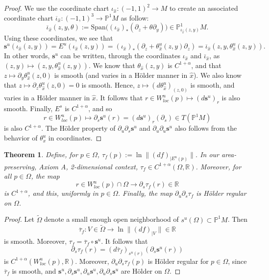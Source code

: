 \documentclass[a4paper]{article}
\newtheorem{theorem}{Theorem}[section]
\theoremstyle{definition}
\begin{document}
\begin{proof}
We use the coordinate chart $\iota_{\widehat{x}} : (-1,1)^2 \rightarrow M$ to create an associated coordinate chart
$ \overline{\iota}_{\widehat{x}} : (-1,1)^3 \rightarrow \mathbb{P}^1 M $ as follow:
$$ \overline{\iota}_{\widehat{x}}(z,y,\theta) := \text{Span} \Big( (\iota_{\widehat{x}})_* (\partial_z + \theta \partial_y) \Big) \in \mathbb{P}^1_{\iota_{\widehat{x}}(z,y)} M.$$
Using these coordinates, we see that
$$ \mathbf{s}^u( \iota_{\widehat{x}}(z,y) ) = E^u(\iota_{\widehat{x}}(z,y)) = (\iota_{\widehat{x}})_*(\partial_z + \theta_{\widehat{x}}^u(z,y) \partial_z ) = \overline{\iota}_{\widehat{x}}(z,y,\theta_{\widehat{x}}^u(z,y)).$$
In other words, $\mathbf{s}^u$ can be written, through the coordinates $\iota_{\widehat{x}}$ and $\overline{\iota}_{\widehat{x}}$, as $(z,y) \mapsto (z,y,\theta_{\widehat{x}}^u(z,y))$.
We know that $\theta_{\widehat{x}}(z,y)$ is $C^{1+\alpha}$, and that $z \mapsto \partial_y \theta_{\widehat{x}}^u(z,0) $ is smooth (and varies in a Hölder manner in ${\widehat{x}}$).
We also know that $z \mapsto \partial_z \theta_{\widehat{x}}^u(z,0) = 0$ is smooth. Hence, $z \mapsto (d\theta_{\widehat{x}}^u)_{(z,0)}$ is smooth, and varies in a Hölder manner in ${\widehat{x}}$. It follows that $r \in W^u_{loc}(p) \mapsto (d \mathbf{s}^u)_r $ is also smooth. Finally, $E^s$ is $C^{1+\alpha}$, and so 
$$r \in W^u_{loc}(p) \mapsto \partial_s \mathbf{s}^u(r) = (d \mathbf{s}^u)_r(\partial_s) \in T(\mathbb{P}^1 M) $$
is also $C^{1+\alpha}$. The Hölder property of $\partial_u \partial_s \mathbf{s}^u$ and $\partial_u \partial_u \mathbf{s}^u$ also follows from the behavior of $\theta_x^u$ in coordinates.
\end{proof}

\begin{theorem}
Define, for $p \in \Omega$, $\tau_f(p) := \ln \|{ (df)}_{|E^u(p)} \|$. In our area-preserving, Axiom A, 2-dimensional context, $\tau_f \in C^{1+\alpha}(\Omega,\mathbb{R})$. Moreover, for all $p \in \Omega$, the map $$ r \in W^u_{loc}(p) \cap \Omega \longrightarrow \partial_s \tau_f(r) \in \mathbb{R} $$
is $C^{1+\alpha}$, and this, uniformly in $p \in \Omega$. Finally, the map $\partial_u \partial_s \tau_f$ is Hölder regular on $\Omega$.
\end{theorem}

\begin{proof}
Let $\tilde{\Omega}$ denote a small enough open neighborhood of $s^u(\Omega) \subset \mathbb{P}^1 M$. Then $$ \overline{\tau}_f : V \in \tilde{\Omega} \longrightarrow \ln \| (df)_{|V} \| \in \mathbb{R} $$
is smooth. Moreover, $\tau_f = \overline{\tau}_f \circ \mathbf{s}^u$. It follows that $$ \partial_s \tau_f(r) = (d \overline{\tau}_f)_{s^u(r)}( \partial_s \mathbf{s}^u(r) ) $$ is $C^{1+\alpha}(W^u_{loc}(p),\mathbb{R})$. Moreover, $\partial_u \partial_s \tau_f(p)$ is Hölder regular for $p \in \Omega$, since $\overline{\tau}_f$ is smooth, and $\mathbf{s}^u, \partial_s \mathbf{s}^u,\partial_u \mathbf{s}^u, \partial_u \partial_s \mathbf{s}^u$ are Hölder on $\Omega$.
\end{proof}
\end{document}
